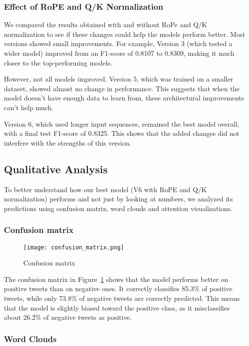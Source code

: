 \documentclass[twocolumn,superscriptaddress,aps]{revtex4-1}
\begin{document}
\subsubsection{Effect of RoPE and Q/K Normalization}

We compared the results obtained with and without RoPe and Q/K normalization to see if these changes could help the models perform better. Most versions showed small improvements. For example, Version 3 (which tested a wider model) improved from an F1-score of 0.8107 to 0.8309, making it much closer to the top-performing models.

However, not all models improved. Version 5, which was trained on a smaller dataset, showed almost no change in performance. This suggests that when the model doesn't have enough data to learn from, these architectural improvements can't help much.

Version 6, which used longer input sequences, remained the best model overall, with a final test F1-score of 0.8325. This shows that the added changes did not interfere with the strengths of this version.

\subsection{Qualitative Analysis}
To better understand how our best model (V6 with RoPE and Q/K normalization) performs and not just by looking at numbers, we analyzed its predictions using confusion matrix, word clouds and attention visualizations.

\subsubsection{Confusion matrix}
\begin{figure}[t]
\texttt{[image: confusion\_matrix.png]}
\caption{Confusion matrix}
\label{fig:conf_matrix}
\end{figure}
The confusion matrix in Figure~\ref{fig:conf_matrix} shows that the model performs better on positive tweets than on negative ones. It correctly classifies 85.3\% of positive tweets, while only 73.8\% of negative tweets are correctly predicted. This means that the model is slightly biased toward the positive class, as it misclassifies about 26.2\% of negative tweets as positive.

\subsubsection{Word Clouds}
\end{document}
